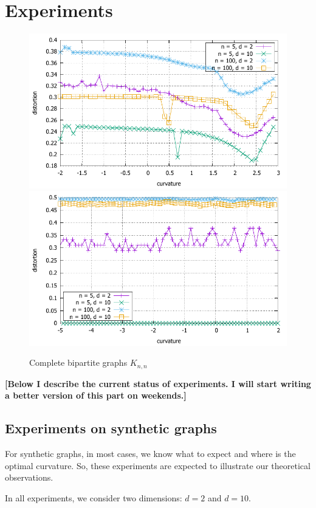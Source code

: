 \documentclass{article} %
\begin{document}
\section{Experiments}

\begin{figure}
    \centering
    \includegraphics[width = 0.49 \textwidth]{bipartite_distortion.pdf}
    \includegraphics[width = 0.49 \textwidth]{bipartite_zero_one.pdf}
    \caption{Complete bipartite graphs $K_{n,n}$}
    \label{fig:bipartite}
\end{figure}

\textbf{[Below I describe the current status of experiments. I will start writing a better version of this part on weekends.]}

\subsection{Experiments on synthetic graphs}

For synthetic graphs, in most cases, we know what to expect and where is the optimal curvature. So, these experiments are expected to illustrate our theoretical observations. 

In all experiments, we consider two dimensions: $d = 2$ and $d = 10$.
\end{document}

